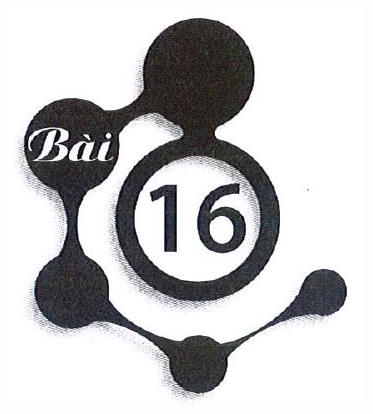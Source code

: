 \documentclass[10pt]{article}
\begin{document}
\begin{itemize}
\includegraphics[max width=\textwidth, center]{2025_10_23_adad5b98d65ac6665838g-32}
\end{itemize}
\end{document}
